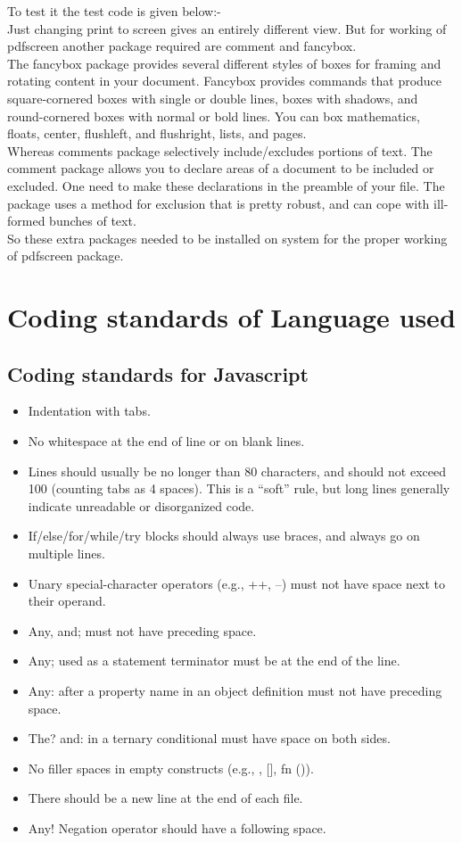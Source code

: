 \noindent To test it the test code is given below:-\\
Just changing print to screen gives an entirely different view. But for working of pdfscreen another package required are comment and fancybox.\\

\noindent The fancybox package provides several different styles of boxes for framing and rotating content in your document. Fancybox provides commands that produce square-cornered boxes with single or double lines, boxes with shadows, and round-cornered boxes with normal or bold lines. You can box mathematics, floats, center, flushleft, and flushright, lists, and pages.\\
 	
\noindent Whereas comments package selectively include/excludes portions of text. The comment package allows you to declare areas of a document to be included or excluded. One need to make these declarations in the preamble of your file. The package uses a method for exclusion that is pretty robust, and can cope with ill-formed bunches of text.\\

\noindent So these extra packages needed to be installed on system for the proper working of pdfscreen package.


	\section{Coding standards of Language used 
}

\subsection{Coding standards for Javascript }
\begin{itemize}

\item Indentation with tabs.
\item No whitespace at the end of line or on blank lines.
\item Lines should usually be no longer than 80 characters, and should not exceed 100 (counting tabs as 4 spaces). This is a “soft” rule, but long lines generally indicate unreadable or disorganized code.
\item If/else/for/while/try blocks should always use braces, and always go on multiple lines.
\item Unary special-character operators (e.g., ++, --) must not have space next to their operand.
\item Any, and; must not have preceding space.
\item Any; used as a statement terminator must be at the end of the line.
\item Any: after a property name in an object definition must not have preceding space.
\item The? and: in a ternary conditional must have space on both sides.
\item No filler spaces in empty constructs (e.g., {}, [], fn ()).
\item There should be a new line at the end of each file.
\item Any! Negation operator should have a following space.
\end{itemize}
